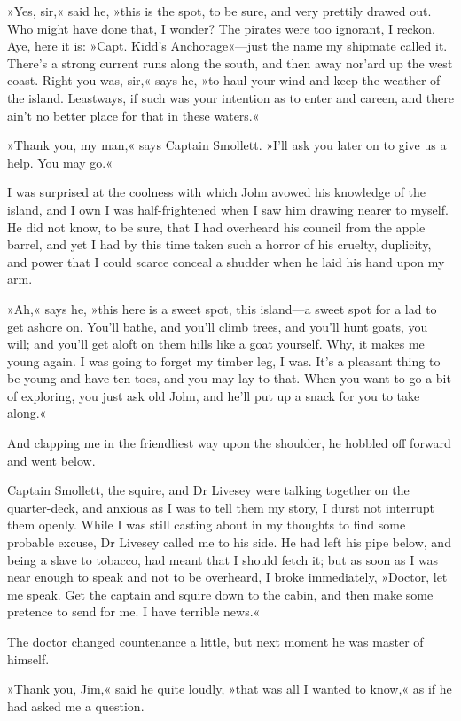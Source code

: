 »Yes, sir,« said he, »this is the spot, to be sure, and very prettily drawed out. Who might have done that, I wonder? The pirates were too ignorant, I reckon. Aye, here it is: »Capt. Kidd's Anchorage«—just the name my shipmate called it. There's a strong current runs along the south, and then away nor'ard up the west coast. Right you was, sir,« says he, »to haul your wind and keep the weather of the island. Leastways, if such was your intention as to enter and careen, and there ain't no better place for that in these waters.«

»Thank you, my man,« says Captain Smollett. »I'll ask you later on to give us a help. You may go.«

I was surprised at the coolness with which John avowed his knowledge of the island, and I own I was half-frightened when I saw him drawing nearer to myself. He did not know, to be sure, that I had overheard his council from the apple barrel, and yet I had by this time taken such a horror of his cruelty, duplicity, and power that I could scarce conceal a shudder when he laid his hand upon my arm.

»Ah,« says he, »this here is a sweet spot, this island—a sweet spot for a lad to get ashore on. You'll bathe, and you'll climb trees, and you'll hunt goats, you will; and you'll get aloft on them hills like a goat yourself. Why, it makes me young again. I was going to forget my timber leg, I was. It's a pleasant thing to be young and have ten toes, and you may lay to that. When you want to go a bit of exploring, you just ask old John, and he'll put up a snack for you to take along.«

And clapping me in the friendliest way upon the shoulder, he hobbled off forward and went below.

Captain Smollett, the squire, and Dr Livesey were talking together on the quarter-deck, and anxious as I was to tell them my story, I durst not interrupt them openly. While I was still casting about in my thoughts to find some probable excuse, Dr Livesey called me to his side. He had left his pipe below, and being a slave to tobacco, had meant that I should fetch it; but as soon as I was near enough to speak and not to be overheard, I broke immediately, »Doctor, let me speak. Get the captain and squire down to the cabin, and then make some pretence to send for me. I have terrible news.«

The doctor changed countenance a little, but next moment he was master of himself.

»Thank you, Jim,« said he quite loudly, »that was all I wanted to know,« as if he had asked me a question.

